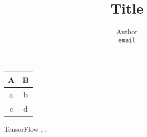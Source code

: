\documentclass[a4paper,11pt]{article}
\title{Title}
\author{
  Author\\
  \texttt{email}
}
\date{}
\begin{document}
  \maketitle

  \begin{tabular}[t]{cc}
    \toprule
    A & B \\
    \midrule
    a & b \\
    c & d \\
    \bottomrule
  \end{tabular}


  TensorFlow \citep{tf}, \citet{tf}.


  \setlength{}
  \renewcommand{\bibname}{Bibliography}
  
\end{document}
